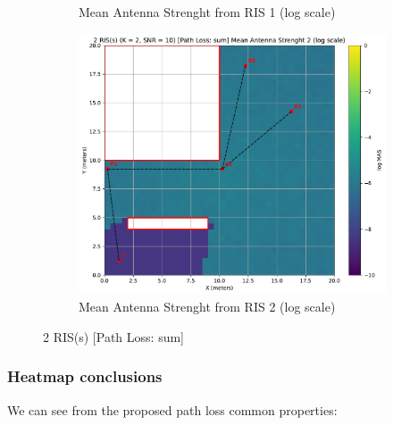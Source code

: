 \begin{figure}[H]
\begin{subfigure}[b]{0.48\textwidth}
    \caption{Mean Antenna Strenght from RIS 1 (log scale)}
  \end{subfigure}
  \hfill
  \begin{subfigure}[b]{0.48\textwidth}
    \centering
    \includegraphics[width=\textwidth]{imgs/heatmap-simulations/2 RIS(s) (K = 2, SNR = 10) [Path Loss: sum] Mean Antenna Strenght 2 (log scale).pdf}
    \caption{Mean Antenna Strenght from RIS 2 (log scale)}
  \end{subfigure}
  \caption{2 RIS(s) [Path Loss: sum]}
\end{figure}

\subsubsection{Heatmap conclusions}

We can see from the proposed path loss common properties:

